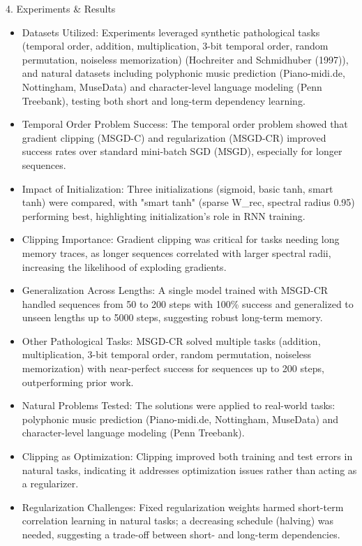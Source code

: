 \documentclass[final]{beamer}
\begin{document}
\begin{frame}[t]
\begin{columns}[t,totalwidth=\textwidth]
\begin{column}{0.35\textwidth}
\begin{block}{4. Experiments \& Results}
  \small{
  \begin{itemize}
    \item Datasets Utilized: Experiments leveraged synthetic pathological tasks (temporal order, addition, multiplication, 3-bit temporal order, random permutation, noiseless memorization) (Hochreiter and Schmidhuber (1997)), and natural datasets including polyphonic music prediction (Piano-midi.de, Nottingham, MuseData) and character-level language modeling (Penn Treebank), testing both short and long-term dependency learning.
    \item Temporal Order Problem Success: The temporal order problem showed that gradient clipping (MSGD-C) and regularization (MSGD-CR) improved success rates over standard mini-batch SGD (MSGD), especially for longer sequences.
    \item Impact of Initialization: Three initializations (sigmoid, basic tanh, smart tanh) were compared, with "smart tanh" (sparse W\_rec, spectral radius 0.95) performing best, highlighting initialization's role in RNN training.
    \item Clipping Importance: Gradient clipping was critical for tasks needing long memory traces, as longer sequences correlated with larger spectral radii, increasing the likelihood of exploding gradients.
    \item Generalization Across Lengths: A single model trained with MSGD-CR handled sequences from 50 to 200 steps with 100\% success and generalized to unseen lengths up to 5000 steps, suggesting robust long-term memory. 
    \item Other Pathological Tasks: MSGD-CR solved multiple tasks (addition, multiplication, 3-bit temporal order, random permutation, noiseless memorization) with near-perfect success for sequences up to 200 steps, outperforming prior work. 
    \item Natural Problems Tested: The solutions were applied to real-world tasks: polyphonic music prediction (Piano-midi.de, Nottingham, MuseData) and character-level language modeling (Penn Treebank). 
    \item Clipping as Optimization: Clipping improved both training and test errors in natural tasks, indicating it addresses optimization issues rather than acting as a regularizer. 
    \item Regularization Challenges: Fixed regularization weights harmed short-term correlation learning in natural tasks; a decreasing schedule (halving) was needed, suggesting a trade-off between short- and long-term dependencies. 

\end{itemize}}
\end{block}
\end{column}
\end{columns}
\end{frame}
\end{document}
